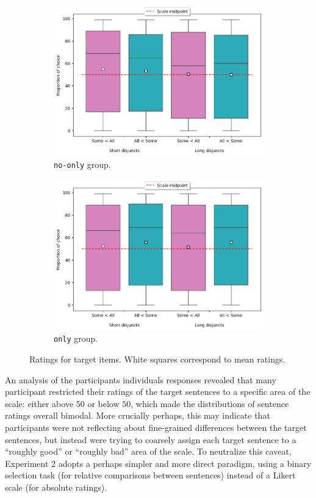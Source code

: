 \begin{figure}[H]
	\centering
	\begin{subfigure}[b]{.45\linewidth}
		\centering
		\includegraphics[width=\linewidth]{./images/exp1-target-noonly.png}
		\caption{\texttt{no-only} group.}
	\end{subfigure}
	\hfill
	\begin{subfigure}[b]{.45\linewidth}
		\centering
		\includegraphics[width=\linewidth]{./images/exp1-target-only.png}
		\caption{\texttt{only} group.}
	\end{subfigure}
	\caption{Ratings for target items. White squares correspond to mean ratings.}\label{fig7:exp1-targets}
\end{figure}


An analysis of the participants individuals responses revealed that many participant restricted their ratings of the target sentences to a specific area of the scale: either above $50$ or below $50$, which made the distributions of sentence ratings overall bimodal. More crucially perhaps, this may indicate that participants were not reflecting about fine-grained differences between the target sentences, but instead were trying to coarsely assign each target sentence to a ``roughly good'' or ``roughly bad'' area of the scale. To neutralize this caveat, Experiment 2 adopts a perhaps simpler and more direct paradigm, using a binary selection task (for relative comparisons between sentences) instead of a Likert scale (for absolute ratings).

